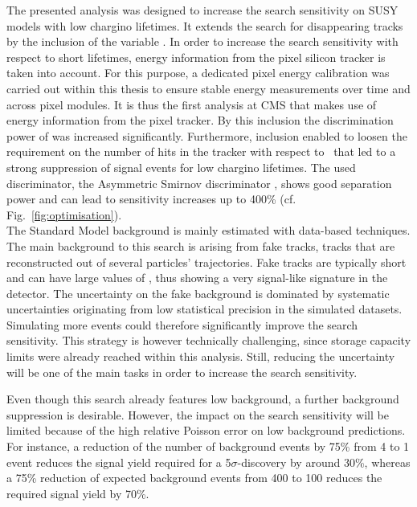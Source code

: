 The presented analysis was designed to increase the search sensitivity on SUSY models with low chargino lifetimes.
It extends the search for disappearing tracks~\cite{bib:CMS:DT_8TeV} by the inclusion of the variable \dedx.
In order to increase the search sensitivity with respect to short lifetimes, energy information from the pixel silicon tracker is taken into account.
For this purpose, a dedicated pixel energy calibration was carried out within this thesis to ensure stable energy measurements over time and across pixel modules.
It is thus the first analysis at CMS that makes use of energy information from the pixel tracker.
By this inclusion the discrimination power of \dedx was increased significantly.
Furthermore, \dedx inclusion enabled to loosen the requirement on the number of hits in the tracker with respect to~\cite{bib:CMS:DT_8TeV} that led to a strong suppression of signal events for low chargino lifetimes. 
The used \dedx discriminator, the Asymmetric Smirnov discriminator \ias, shows good separation power and can lead to sensitivity increases up to 400\% (cf. Fig.~\ref{fig:optimisation}).\\


The Standard Model background is mainly estimated with data-based techniques.
The main background to this search is arising from fake tracks, \ie tracks that are reconstructed out of several particles' trajectories.
Fake tracks are typically short and can have large values of \ias, thus showing a very signal-like signature in the detector.
The uncertainty on the fake background is dominated by systematic uncertainties originating from low statistical precision in the simulated datasets.
Simulating more events could therefore significantly improve the search sensitivity.
This strategy is however technically challenging, since storage capacity limits were already reached within this analysis.
Still, reducing the uncertainty will be one of the main tasks in order to increase the search sensitivity.

Even though this search already features low background, a further background suppression is desirable.
However, the impact on the search sensitivity will be limited because of the high relative Poisson error on low background predictions.
For instance, a reduction of the number of background events by 75\% from 4 to 1 event reduces the signal yield required for a 5$\sigma$-discovery by around 30\%, whereas a 75\% reduction of expected background events from 400 to 100 reduces the required signal yield by 70\%.


